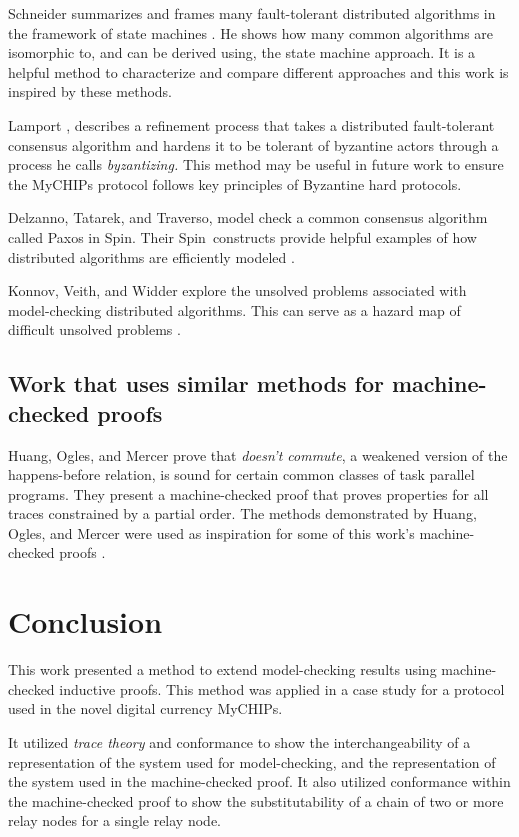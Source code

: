 \documentclass[runningheads]{llncs}
\newcommand{\spin}{Spin}
\newif\ifcomments
\newif\ifkylecomments
\newcommand{\egm}[1]{\ifcomments\textcolor{orange}{egm: #1}\fi}
\newcommand{\krs}[1]{\ifkylecomments\textcolor{blue}{krs: #1}\fi}
\begin{document}
 Schneider summarizes and frames many fault-tolerant distributed algorithms in the framework of state machines \cite{StateMachine}. He shows how many common algorithms are isomorphic to, and can be derived using, the state machine approach. It is a helpful method to characterize and compare different approaches and this work is inspired by these methods.
 
 Lamport \cite{Lamport}, describes a refinement process that takes a distributed fault-tolerant consensus algorithm and hardens it to be tolerant of byzantine actors through a process he calls \emph{byzantizing.} This method may be useful in future work to ensure the MyCHIPs protocol follows key principles of Byzantine hard protocols.
 
 Delzanno, Tatarek, and Traverso, model check a common consensus algorithm called Paxos in \spin. Their \spin\ constructs provide helpful examples of how distributed algorithms are efficiently modeled \cite{Delzanno_2014}.
 
 Konnov, Veith, and Widder explore the unsolved problems associated with model-checking distributed algorithms. This can serve as a hazard map of difficult unsolved problems \cite{Konnov}.

\subsection{Work that uses similar methods for machine-checked proofs}
 Huang, Ogles, and Mercer prove that \emph{doesn't commute}, a weakened version of the happens-before relation, is sound for certain common classes of task parallel programs. They present a machine-checked proof that proves properties for all traces constrained by a partial order. The methods demonstrated by Huang, Ogles, and Mercer were used as inspiration for some of this work's machine-checked proofs \cite{ben_DC}.
 
\section{Conclusion}
\label{sec:conclusion}
\krs{Hopefully this is more then just boilerplate\egm{Add a conclusion!!}}
This work presented a method to extend model-checking results using machine-checked inductive proofs. This method was applied in a case study for a protocol used in the novel digital currency MyCHIPs. 

It utilized \emph{trace theory} and conformance to show the interchangeability of a representation of the system used for model-checking, and the representation of the system used in the machine-checked proof. It also utilized conformance within the machine-checked proof to show the substitutability of a chain of two or more relay nodes for a single relay node.
\end{document}
